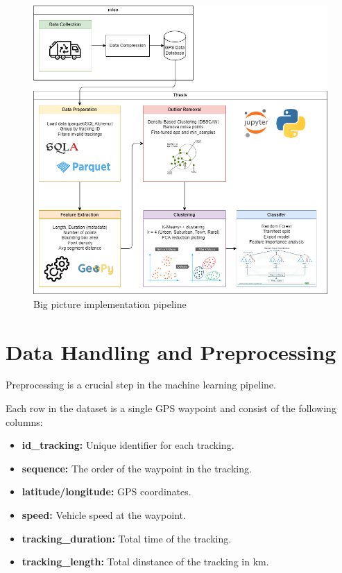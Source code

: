 \documentclass[a4paper,12pt,twoside]{scrreprt}
\begin{document}
\begin{figure}[htbp]
  \centering

  \includegraphics[width=\textwidth]{Diagrams/drawio/big_picture_implementation.png}
  \caption{Big picture implementation pipeline}
  \label{fig:big_picture_implemetation_diagram}
\end{figure}
\FloatBarrier

\section{Data Handling and Preprocessing}
Preprocessing is a crucial step in the machine learning pipeline.

Each row in the dataset is a single GPS waypoint and consist of the following
columns:

\begin{itemize}
  \item \textbf{id\_tracking:} Unique identifier for each tracking.
  \item \textbf{sequence:} The order of the waypoint in the tracking.
  \item \textbf{latitude/longitude:} GPS coordinates.
  \item \textbf{speed:} Vehicle speed at the waypoint.
  \item \textbf{tracking\_duration:} Total time of the tracking.
  \item \textbf{tracking\_length:} Total dinstance of the tracking in km.
\end{itemize}
\end{document}
